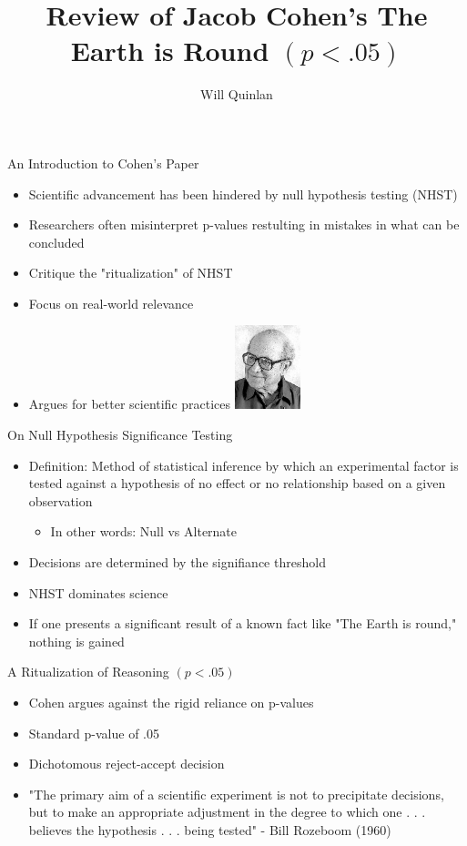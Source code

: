 \documentclass[aspectratio=169, 12pt]{beamer}
\title{Review of Jacob Cohen's The Earth is Round $(p < .05)$}
\author{Will Quinlan}
\begin{document}
 
\frame{\titlepage}

\begin{frame}{An Introduction to Cohen's Paper}
  \begin{itemize}
  \item Scientific advancement has been hindered by null hypothesis testing (NHST)
  \item Researchers often misinterpret p-values restulting in mistakes in what can be concluded
  \item Critique the "ritualization" of NHST 
  \item Focus on real-world relevance
  \item Argues for better scientific practices
  \includegraphics[width=0.15\textwidth]{./images/JacobCohen.png}
  \end{itemize}
\end{frame}

\begin{frame}{On Null Hypothesis Significance Testing}
  \begin{itemize}
  \item Definition: Method of statistical inference by which an experimental factor is tested against a hypothesis of no effect or no relationship based on a given observation
	\begin{itemize}
	\item In other words: Null vs Alternate
	\end{itemize}
  \item Decisions are determined by the signifiance threshold
  \item NHST dominates science
  \item If one presents a significant result of a known fact like "The Earth is round," nothing is gained
  \end{itemize}
\end{frame}

\begin{frame}{A Ritualization of Reasoning $(p < .05)$}
  \begin{itemize}
  \item Cohen argues against the rigid reliance on p-values
  \item Standard p-value of .05
  \item Dichotomous reject-accept decision
  \item "The primary aim of a scientific experiment is not to precipitate decisions, but to make an appropriate adjustment in the degree to which one . . . believes the hypothesis . . . being
tested" - Bill Rozeboom (1960)
  \end{itemize}
\end{frame}
\end{document}

